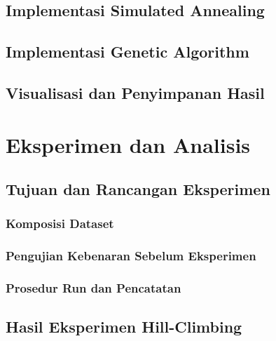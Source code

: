 \documentclass[11pt,a4paper]{article}
\begin{document}
\subsection{Implementasi Simulated Annealing}
\par\pagebreak[0]

\subsection{Implementasi Genetic Algorithm}
\par\pagebreak[0]

\subsection{Visualisasi dan Penyimpanan Hasil}
\par\pagebreak[0]


\section{Eksperimen dan Analisis}
\par\pagebreak[0]

\subsection{Tujuan dan Rancangan Eksperimen}
\par\pagebreak[0]

\subsubsection{Komposisi Dataset}
\par\pagebreak[0]

\subsubsection{Pengujian Kebenaran Sebelum Eksperimen}
\par\pagebreak[0]

\subsubsection{Prosedur Run dan Pencatatan}
\par\pagebreak[0]

\subsection{Hasil Eksperimen Hill-Climbing}
\par\pagebreak[0]
\end{document}
